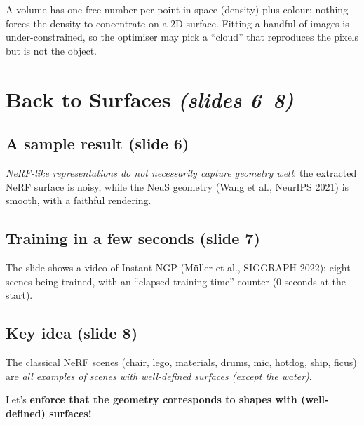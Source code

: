 \documentclass[11pt,a4paper]{article}
\theoremstyle{definition}
\theoremstyle{plain}
\theoremstyle{remark}
\begin{document}

\begin{intuition}
A volume has one free number per point in space (density) plus colour; nothing forces the density to concentrate on a
2D surface. Fitting a handful of images is under-constrained, so the optimiser may pick a ``cloud'' that reproduces
the pixels but is not the object.
\end{intuition}

\section{Back to Surfaces \emph{(slides 6--8)}}
\subsection*{A sample result (slide 6)}
\emph{NeRF-like representations do not necessarily capture geometry well}: the extracted NeRF surface is noisy, while
the NeuS geometry (Wang et al., NeurIPS 2021) is smooth, with a faithful rendering.


\subsection*{Training in a few seconds (slide 7)}
The slide shows a video of Instant-NGP (M\"uller et al., SIGGRAPH 2022): eight scenes being trained, with an
``elapsed training time'' counter (0 seconds at the start).


\subsection*{Key idea (slide 8)}
The classical NeRF scenes (chair, lego, materials, drums, mic, hotdog, ship, ficus) are \emph{all examples of scenes
with well-defined surfaces (except the water)}.

\begin{tcolorbox}[colback=white,colframe=black!60,title=Key idea]
Let's \textbf{enforce that the geometry corresponds to shapes with (well-defined) surfaces!}
\end{tcolorbox}
\end{document}
